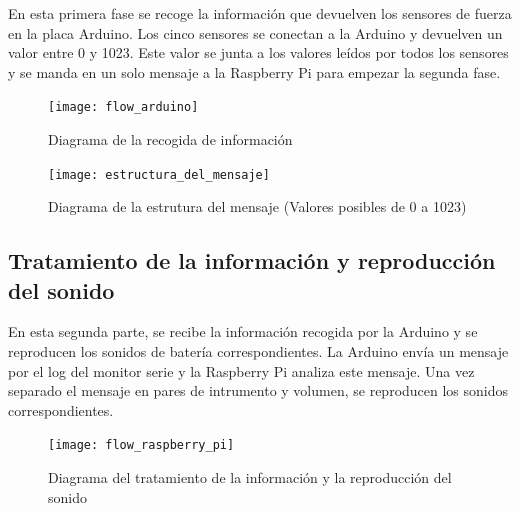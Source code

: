             En esta primera fase se recoge la información que devuelven los sensores de fuerza en la placa Arduino. Los
            cinco sensores se conectan a la Arduino y devuelven un valor entre 0 y 1023. Este valor se junta a los
            valores leídos por todos los sensores y se manda en un solo mensaje a la Raspberry Pi para empezar la
            segunda fase.

            \newpage

            \begin{figure}[ht]
                \centering
                \texttt{[image: flow\_arduino]}
                \caption{Diagrama de la recogida de información \label{fig:DiagramaRecogida}}
            \end{figure}

            \begin{figure}[ht]
                \centering
                \texttt{[image: estructura\_del\_mensaje]}
                \caption{Diagrama de la estrutura del mensaje (Valores posibles de 0 a
                1023) \label{fig:DiagramaEstrutura}}
            \end{figure}


        \subsection{Tratamiento de la información y reproducción del sonido} %
        \label{sub:TratamientoDeLaInformacionYReproduccionDelSonido}

            En esta segunda parte, se recibe la información recogida por la Arduino y se reproducen los sonidos de
            batería correspondientes. La Arduino envía un mensaje por el log del monitor serie y la Raspberry Pi analiza
            este mensaje. Una vez separado el mensaje en pares de intrumento y volumen, se reproducen los sonidos
            correspondientes.

            \begin{figure}[ht]
                \centering
                \texttt{[image: flow\_raspberry\_pi]}
                \caption{Diagrama del tratamiento de la información y la reproducción del
                sonido \label{fig:DiagramaTratamiento}}
            \end{figure}


